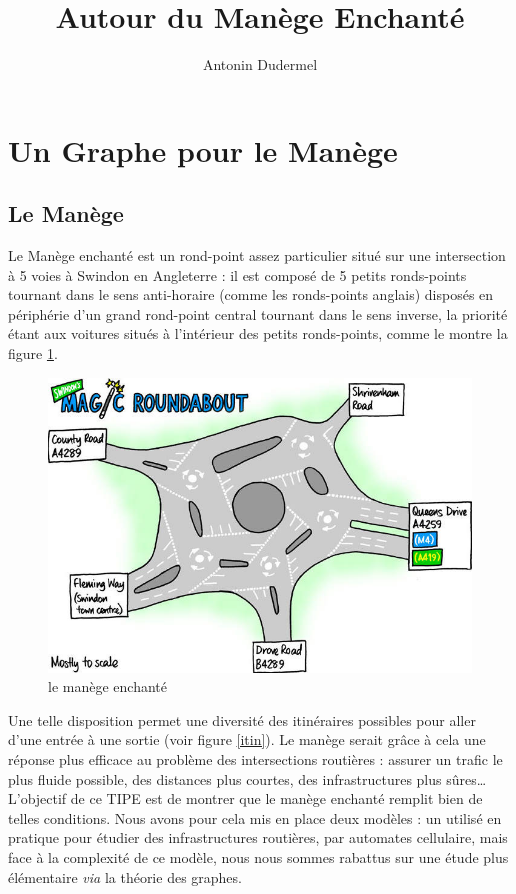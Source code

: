 \documentclass[11pt]{article}
\title{Autour du Manège Enchanté}
\date{}
\author{Antonin Dudermel}
\begin{document}

\maketitle

\section{Un Graphe pour le Manège}
	\subsection{Le Manège}
	
Le Manège enchanté est un rond-point assez particulier situé sur une intersection à 5 voies à Swindon en Angleterre : il est composé de 5 petits ronds-points tournant dans le sens anti-horaire (comme les ronds-points anglais) disposés en périphérie d'un grand rond-point central tournant dans le sens inverse, la priorité étant aux voitures situés à l'intérieur des petits ronds-points, comme le montre la figure \ref{rp}.
\begin{figure}
	\begin{center}
		\caption{\label{rp}le manège enchanté}
		\includegraphics[scale=0.4]{images/magic-brit}
	\end{center}
\end{figure}

Une telle disposition permet une diversité des itinéraires possibles pour aller d'une entrée à une sortie (voir figure \ref{itin}). Le manège serait grâce à cela une réponse plus efficace au problème des intersections routières : assurer un trafic le plus fluide possible, des distances plus courtes, des infrastructures plus sûres… L'objectif de ce TIPE est de montrer que le manège enchanté remplit bien de telles conditions. Nous avons pour cela mis en place deux modèles : un utilisé en pratique pour étudier des infrastructures routières, par automates cellulaire, mais face à la complexité de ce modèle, nous nous sommes rabattus sur une étude plus élémentaire {\it via} la théorie des graphes.
\end{document}
